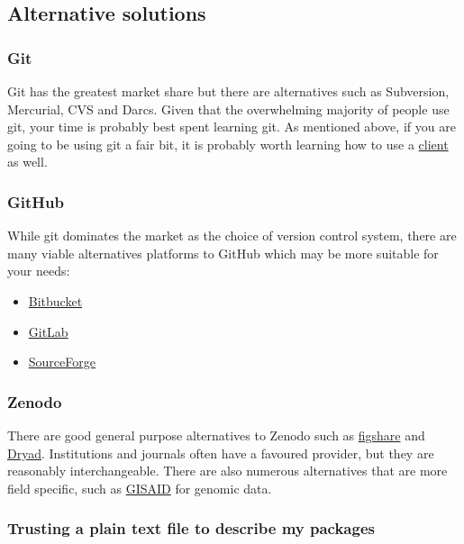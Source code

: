 \documentclass[11pt,onecolumn]{scrartcl}
\begin{document}
\subsection{Alternative solutions}
\label{sec:orgc4d53ef}

\subsubsection*{Git}
\label{sec:org10e755c}

Git has the greatest market share but there are alternatives such as Subversion,
Mercurial, CVS and Darcs. Given that the overwhelming majority of people use
git, your time is probably best spent learning git. As mentioned above, if you
are going to be using git a fair bit, it is probably worth learning how to use a
\hyperref[sec:orgf18f21c]{client} as well.

\subsubsection*{GitHub}
\label{sec:org5c386fd}

While git dominates the market as the choice of version control system, there
are many viable alternatives platforms to GitHub which may be more suitable for
your needs:

\begin{itemize}
\item \href{https://bitbucket.org/product/}{Bitbucket}
\item \href{https://about.gitlab.com/}{GitLab}
\item \href{https://sourceforge.net/}{SourceForge}
\end{itemize}

\subsubsection*{Zenodo}
\label{sec:org4ac3319}

There are good general purpose alternatives to Zenodo such as \href{https://figshare.com/}{figshare} and
\href{http://datadryad.org/}{Dryad}. Institutions and journals often have a favoured provider, but they are
reasonably interchangeable. There are also numerous alternatives that are more
field specific, such as \href{http://www.gisaid.org/}{GISAID} for genomic data.

\subsubsection*{Trusting a plain text file to describe my packages}
\label{sec:org255c102}
\end{document}

